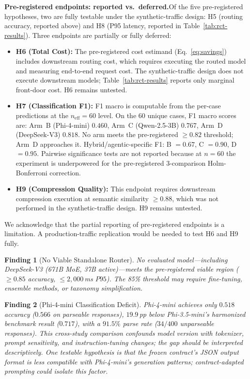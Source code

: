 \documentclass{article}
\newtheorem{finding}{Finding}
\begin{document}
\textbf{Pre-registered endpoints: reported vs.\ deferred.}\quad Of the five pre-registered hypotheses, two are fully testable under the synthetic-traffic design: H5 (routing accuracy, reported above) and H8 (P95 latency, reported in Table~\ref{tab:rct-results}). Three endpoints are partially or fully deferred:
\begin{itemize}[nosep,leftmargin=*]
  \item \textbf{H6 (Total Cost):} The pre-registered cost estimand (Eq.~\ref{eq:savings}) includes downstream routing cost, which requires executing the routed model and measuring end-to-end request cost. The synthetic-traffic design does not execute downstream models; Table~\ref{tab:rct-results} reports only marginal front-door cost. H6 remains untested.
  \item \textbf{H7 (Classification F1):} F1 macro is computable from the per-case predictions at the $n_{\text{eff}} = 60$ level. On the 60 unique cases, F1 macro scores are: Arm~B (Phi-4-mini) $0.460$, Arm~C (Qwen-2.5-3B) $0.767$, Arm~D (DeepSeek-V3) $0.818$. No arm meets the pre-registered $\geq 0.82$ threshold; Arm~D approaches it. Hybrid/agentic-specific F1: B $= 0.67$, C $= 0.90$, D $= 0.95$. Pairwise significance tests are not reported because at $n = 60$ the experiment is underpowered for the pre-registered 3-comparison Holm-Bonferroni correction.
  \item \textbf{H9 (Compression Quality):} This endpoint requires downstream compression execution at semantic similarity $\geq 0.88$, which was not performed in the synthetic-traffic design. H9 remains untested.
\end{itemize}
We acknowledge that the partial reporting of pre-registered endpoints is a limitation. A production-traffic replication would be needed to test H6 and H9 fully.

\begin{finding}[No Viable Standalone Router]
\label{find:no-viable}
\emph{No evaluated model---including DeepSeek-V3 (671B MoE, 37B active)---meets the pre-registered viable region ($\geq 0.85$ accuracy, $\leq 2{,}000$\,ms $P95$). The 85\% threshold may require fine-tuning, ensemble methods, or taxonomy simplification.}
\end{finding}

\begin{finding}[Phi-4-mini Classification Deficit]
\label{find:phi4-regression}
\emph{Phi-4-mini achieves only $0.518$ accuracy ($0.566$ on parseable responses), $19.9$\,pp below Phi-3.5-mini's harmonized benchmark result ($0.717$), with a $91.5\%$ parse rate ($34/400$ unparseable responses). This cross-study comparison confounds model version with tokenizer, prompt sensitivity, and instruction-tuning changes; the gap should be interpreted descriptively. One testable hypothesis is that the frozen contract's JSON output format is less compatible with Phi-4-mini's generation patterns; contract-adapted prompting could isolate this factor.}
\end{finding}
\end{document}
